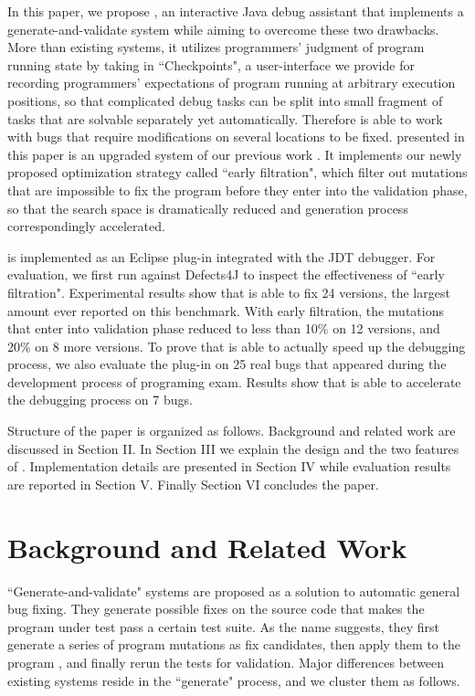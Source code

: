 In this paper, we propose \SmartDebug, an interactive Java debug assistant that implements a generate-and-validate system while aiming to overcome these two drawbacks. More than existing systems, it utilizes programmers' judgment of program running state by taking in ``Checkpoints", a user-interface we provide for recording programmers' expectations of program running at arbitrary execution positions, so that complicated debug tasks can be split into small fragment of tasks that are solvable separately yet automatically. Therefore \SmartDebug is able to work with bugs that require modifications on several locations to be fixed. \SmartDebug presented in this paper is an upgraded system of our previous work \cite{Guo:2016:SID:2950290.2983971}. It implements our newly proposed optimization strategy called ``early filtration", which filter out mutations that are impossible to fix the program before they enter into the validation phase, so that the search space is dramatically reduced and generation process correspondingly accelerated.

\SmartDebug is implemented as an Eclipse plug-in integrated with the JDT debugger. For evaluation, we first run \SmartDebug against Defects4J to inspect the effectiveness of ``early filtration". Experimental results show that \SmartDebug is able to fix 24 versions, the largest amount ever reported on this benchmark. With early filtration, the mutations that enter into validation phase reduced to less than 10\% on 12 versions, and 20\% on 8 more versions. To prove that \SmartDebug is able to actually speed up the debugging process, we also evaluate the plug-in on 25 real bugs that appeared during the development process of programing exam. Results show that \SmartDebug is able to accelerate the debugging process on 7 bugs.

Structure of the paper is organized as follows. Background and related work are discussed in Section II. In Section III we explain the design and the two features of \SmartDebug. Implementation details are presented in Section IV while evaluation results are reported in Section V. Finally Section VI concludes the paper.



\section{Background and Related Work}
``Generate-and-validate" systems are proposed as a solution to automatic general bug fixing. They generate possible fixes on the source code that makes the program under test pass a certain test suite. As the name suggests, they first generate a series of program mutations as fix candidates, then apply them to the program , and finally rerun the tests for validation. Major differences between existing systems reside in the ``generate" process, and we cluster them as follows.

